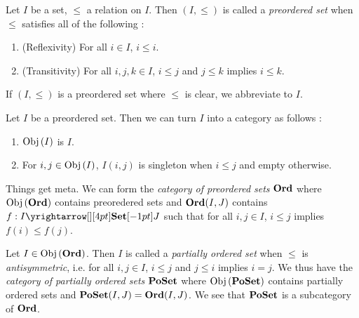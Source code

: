\begin{eg}
  
  Let $I$ be a set, $\leq$ a relation on $I$. 
  Then $(I,\leq)$ is called a \emph{preordered set} when 
  $\leq$ satisfies all of the following : 
  \begin{enumerate}
    \item (Reflexivity) For all $i \in I$, $i \leq i$. 
    \item (Transitivity) For all $i, j, k \in I$, 
    $i \leq j$ and $j \leq k$ implies $i \leq k$. 
  \end{enumerate}
  If $(I,\leq)$ is a preordered set where $\leq$ is clear, 
  we abbreviate to $I$.

  Let $I$ be a preordered set. 
  Then we can turn $I$ into a category as follows : 
  \begin{enumerate}
    \item $\mathrm{Obj}\left(I\right)$ is $I$. 
    \item For $i, j \in \mathrm{Obj}\left(I\right)$, $I(i,j)$ is 
    singleton when $i \leq j$ and empty otherwise.  
  \end{enumerate}

  Things get meta. 
  We can form the \emph{category of preordered sets} $\mathbf{Ord}$ where 
  $\mathrm{Obj}\left(\mathbf{Ord}\right)$ contains preoredered sets and 
  $\mathbf{Ord}(I,J)$ contains $f : \map{I}{J}{\SET}{}$ such that 
  for all $i, j \in I$, $i \leq j$ implies $f(i) \leq f(j)$.
\end{eg}

\begin{eg}
  
  Let $I \in \mathrm{Obj}\left(\mathbf{Ord}\right)$. 
  Then $I$ is called a \emph{partially ordered set} when 
  $\leq$ is \emph{antisymmetric}, i.e.
  for all $i, j \in I$, $i \leq j$ and $j \leq i$ implies $i = j$. 
  We thus have the \emph{category of partially ordered sets} $\mathbf{PoSet}$ where 
  $\mathrm{Obj}\left(\mathbf{PoSet}\right)$ contains partially ordered sets and 
  $\mathbf{PoSet}(I,J) = \mathbf{Ord}(I,J)$. 
  We see that $\mathbf{PoSet}$ is a subcategory of $\mathbf{Ord}$.
\end{eg}

